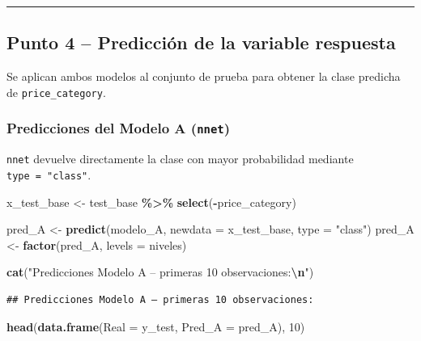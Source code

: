 \documentclass[
]{article}
\newenvironment{Shaded}{\begin{snugshade}}{\end{snugshade}}
\newcommand{\AttributeTok}[1]{\textcolor[rgb]{0.13,0.29,0.53}{#1}}
\newcommand{\DecValTok}[1]{\textcolor[rgb]{0.00,0.00,0.81}{#1}}
\newcommand{\FunctionTok}[1]{\textcolor[rgb]{0.13,0.29,0.53}{\textbf{#1}}}
\newcommand{\NormalTok}[1]{#1}
\newcommand{\OtherTok}[1]{\textcolor[rgb]{0.56,0.35,0.01}{#1}}
\newcommand{\SpecialCharTok}[1]{\textcolor[rgb]{0.81,0.36,0.00}{\textbf{#1}}}
\newcommand{\StringTok}[1]{\textcolor[rgb]{0.31,0.60,0.02}{#1}}
\begin{document}
\begin{center}\rule{0.5\linewidth}{0.5pt}\end{center}

\hypertarget{punto-4-predicciuxf3n-de-la-variable-respuesta}{%
\subsection{Punto 4 -- Predicción de la variable
respuesta}\label{punto-4-predicciuxf3n-de-la-variable-respuesta}}

Se aplican ambos modelos al conjunto de prueba para obtener la clase
predicha de \texttt{price\_category}.

\hypertarget{predicciones-del-modelo-a-nnet}{%
\subsubsection{\texorpdfstring{Predicciones del Modelo A
(\texttt{nnet})}{Predicciones del Modelo A (nnet)}}\label{predicciones-del-modelo-a-nnet}}

\texttt{nnet} devuelve directamente la clase con mayor probabilidad
mediante \texttt{type\ =\ "class"}.

\begin{Shaded}
\begin{Highlighting}[]
\NormalTok{x\_test\_base }\OtherTok{\textless{}{-}}\NormalTok{ test\_base }\SpecialCharTok{\%\textgreater{}\%} \FunctionTok{select}\NormalTok{(}\SpecialCharTok{{-}}\NormalTok{price\_category)}

\NormalTok{pred\_A }\OtherTok{\textless{}{-}} \FunctionTok{predict}\NormalTok{(modelo\_A, }\AttributeTok{newdata =}\NormalTok{ x\_test\_base, }\AttributeTok{type =} \StringTok{"class"}\NormalTok{)}
\NormalTok{pred\_A }\OtherTok{\textless{}{-}} \FunctionTok{factor}\NormalTok{(pred\_A, }\AttributeTok{levels =}\NormalTok{ niveles)}

\FunctionTok{cat}\NormalTok{(}\StringTok{"Predicciones Modelo A – primeras 10 observaciones:}\SpecialCharTok{\textbackslash{}n}\StringTok{"}\NormalTok{)}
\end{Highlighting}
\end{Shaded}

\begin{verbatim}
## Predicciones Modelo A – primeras 10 observaciones:
\end{verbatim}

\begin{Shaded}
\begin{Highlighting}[]
\FunctionTok{head}\NormalTok{(}\FunctionTok{data.frame}\NormalTok{(}\AttributeTok{Real =}\NormalTok{ y\_test, }\AttributeTok{Pred\_A =}\NormalTok{ pred\_A), }\DecValTok{10}\NormalTok{)}
\end{Highlighting}
\end{Shaded}
\end{document}
